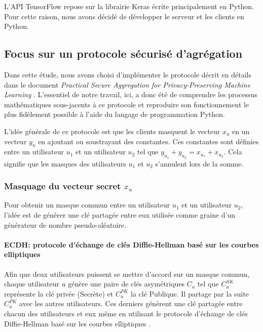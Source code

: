 \documentclass{article}
\begin{document}
L'API TensorFlow repose sur la librairie Keras écrite principalement en Python. Pour cette raison, nous avons décidé de développer le serveur et les clients en Python.

\subsection{Focus sur un protocole sécurisé d'agrégation}

Dans cette étude, nous avons choisi d'implémenter le protocole décrit en détails dans le document \textit{Practical Secure Aggregation for Privacy-Preserving Machine Learning} \cite{BonawitzPracticalSecureAggregation2017}. L'essentiel de notre travail, ici, a donc été de comprendre les processus mathématiques sous-jacents à ce protocole et reproduire son fonctionnement le plus fidèlement possible à l'aide du langage de programmation Python.

L'idée générale de ce protocole est que les clients masquent le vecteur $x_{u}$ en un vecteur $y_{u}$ en ajoutant ou soustrayant des constantes. Ces constantes sont définies entre un utilisateur $u_{1}$ et un utilisateur $u_{2}$ tel que $y_{u_{1}} + y_{u_{2}} = x_{u_{1}} + x_{u_{2}}$. Cela signifie que les masques des utilisateurs $u_1$ et $u_2$ s'annulent lors de la somme.

\subsubsection{Masquage du vecteur secret $x_u$}

Pour obtenir un masque commun entre un utilisateur $u_1$ et un utilisateur $u_2$, l'idée est de générer une clé partagée entre eux utilisée comme graine d'un générateur de nombre pseudo-aléatoire.

\paragraph{ECDH: protocole d'échange de clés Diffie-Hellman basé sur les courbes elliptiques}
Afin que deux utilisateurs puissent se mettre d'accord sur un masque commun, chaque utilisateur $u$ génère une paire de clés asymétriques $C_u$ tel que $C_u^{SK}$ représente la clé privée (Secrète) et $C_u^{PK}$ la clé Publique. Il partage par la suite $C_u^{PK}$ avec les autres utilisateurs. Ces derniers génèrent une clé partagée entre chacun des utilisateurs et eux même en utilisant le protocole d'échange de clés Diffie-Hellman basé sur les courbes elliptiques \cite{BarkerRecommendationPairWiseKeyEstablishment2018}.
\end{document}
